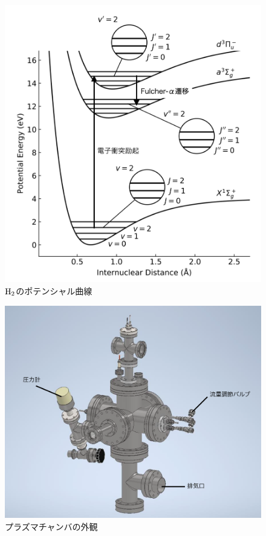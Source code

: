 \listoffigures
{}

\begin{figure}
    \centering
    \includegraphics[width=15cm]{pictures/energy-level.png}
    \caption{$\rm{H}_2$のポテンシャル曲線}
    \label{fig:energy-level}
\end{figure}

\begin{figure}
    \centering
    \includegraphics[width=15cm]{pictures/chamber-picture.png}
    \caption{プラズマチャンバの外観}
    \label{fig:chamber-picture}
\end{figure}

